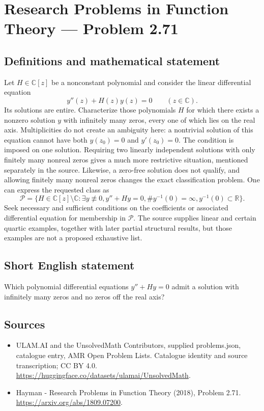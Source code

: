 \documentclass[11pt,a4paper]{article}
\begin{document}
\section*{Research Problems in Function Theory — Problem 2.71}\label{statement}

\subsection{Definitions and mathematical statement}
Let $H\in\mathbb C[z]$ be a nonconstant polynomial and consider the linear differential equation
\[
y''(z)+H(z)y(z)=0\qquad(z\in\mathbb C).
\]
Its solutions are entire. Characterize those polynomials $H$ for which there exists a nonzero solution $y$ with infinitely many zeros, every one of which lies on the real axis. Multiplicities do not create an ambiguity here: a nontrivial solution of this equation cannot have both $y(z_0)=0$ and $y'(z_0)=0$.
The condition is imposed on one solution. Requiring two linearly independent solutions with only finitely many nonreal zeros gives a much more restrictive situation, mentioned separately in the source. Likewise, a zero-free solution does not qualify, and allowing finitely many nonreal zeros changes the exact classification problem.
One can express the requested class as
\[
\mathcal P=\{H\in\mathbb C[z]\setminus\mathbb C:
\exists y\not\equiv0, y''+Hy=0,
\#y^{-1}(0)=\infty, y^{-1}(0)\subset\mathbb R\}.
\]
Seek necessary and sufficient conditions on the coefficients or associated differential equation for membership in $\mathcal P$. The source supplies linear and certain quartic examples, together with later partial structural results, but those examples are not a proposed exhaustive list.
\subsection{Short English statement}
Which polynomial differential equations $y''+Hy=0$ admit a solution with infinitely many zeros and no zeros off the real axis?
\subsection{Sources}
\begin{itemize}
\item[S1] ULAM.AI and the UnsolvedMath Contributors, supplied problems.json, catalogue entry, AMR Open Problem Lists. Catalogue identity and source transcription; CC BY 4.0.
\url{https://huggingface.co/datasets/ulamai/UnsolvedMath}.
\item[S2] Hayman - Research Problems in Function Theory (2018), Problem 2.71. 
\url{https://arxiv.org/abs/1809.07200}.
\end{itemize}
\end{document}
